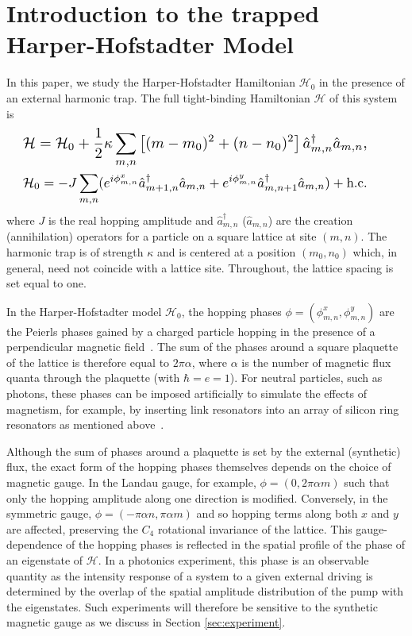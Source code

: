\documentclass[twocolumn, 10pt, aps, superscriptaddress, floatfix, showpacs, pra, citeautoscript]{revtex4-1}
\begin{document}
\section{Introduction to the trapped Harper-Hofstadter Model}
\label{sec:model}

In this paper, we study the Harper-Hofstadter Hamiltonian $\mathcal{H}_0$ in the presence of an external harmonic trap. The full tight-binding Hamiltonian $\mathcal{H}$ of this system is
%
\begin{eqnarray}
{\resizebox{.9\hsize}{!}{$\displaystyle{\mathcal{H}=\mathcal{H}_0+\frac{1}{2}\kappa
\sum_{m,n}\left[(m-m_0)^{2}+(n-n_0)^{2}\right]\hat{a}_{m,n}^{\dagger}\hat{a}_{m,n},}$}}  \qquad \label{eq:model}\\
{\resizebox{.9\hsize}{!}{$\displaystyle{\mathcal{H}_0=-J\sum_{m,n}(e^{i \phi_{m,n}^x}\hat{a}_{m+1,n}^{\dagger}\hat{a}_{m,n} 
+e^{i \phi_{m,n}^y}\hat{a}_{m,n+1}^{\dagger}\hat{a}_{m,n}) + \text{h.c.} }$}} \qquad\label{eq:hh_hamiltonian}
\end{eqnarray}
%
where $J$ is the real hopping amplitude and $\hat{a}_{m,n}^{\dagger}$ ($\hat{a}_{m,n}$) are the creation (annihilation) operators for a particle on a square lattice at site $(m,n)$. The harmonic trap is of strength $\kappa$ and is centered at a position $(m_0, n_0)$ which, in general, need not coincide with a lattice site. Throughout, the lattice spacing is set equal to one. 

In the Harper-Hofstadter model $\mathcal{H}_0$, the hopping phases $\phi = (\phi_{m,n}^x, \phi_{m,n}^y)$ are the Peierls phases gained by a charged particle hopping in the presence of a perpendicular magnetic field~\cite{harper1955magnetic,hofstadter1976butterfly}. The sum of the phases around a square plaquette of the lattice is therefore equal to $2\pi\alpha$, where $\alpha$ is the number of magnetic flux quanta through the plaquette (with $\hbar=e=1$). For neutral particles, such as photons, these phases can be imposed artificially to simulate the effects of magnetism, for example, by inserting link resonators into an array of silicon ring resonators as mentioned above~\cite{hafezi2013imaging}. 

Although the sum of phases around a plaquette is set by the external (synthetic) flux, the exact form of the hopping phases themselves depends on the choice of magnetic gauge. In the Landau gauge, for example, $\phi = (0, 2\pi\alpha m)$ such that only the hopping amplitude along one direction is modified. Conversely, in the symmetric gauge, $\phi = (-\pi\alpha n, \pi\alpha m)$ and so hopping terms along both $x$ and $y$ are affected, preserving the $C_4$ rotational invariance of the lattice. This gauge-dependence of the hopping phases is reflected in the spatial profile of the phase of an eigenstate of $\mathcal{H}$. In a photonics experiment, this phase is an observable quantity as the intensity response of a system to a given external driving is determined by the overlap of the spatial amplitude distribution of the pump with the eigenstates. Such experiments will therefore be sensitive to the synthetic magnetic gauge as we discuss in Section \ref{sec:experiment}.
\end{document}
